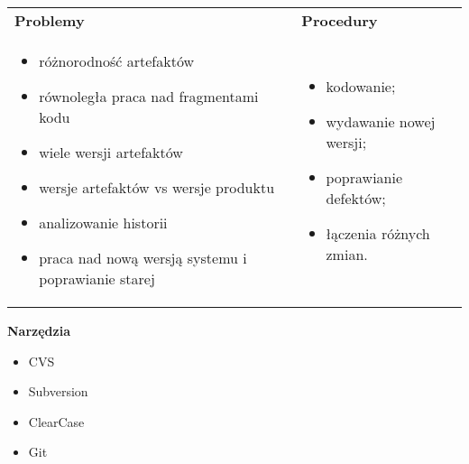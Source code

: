 \documentclass[../main.tex]{subfiles}
\begin{document}
    \begin{table}[H]
        \begin{center}
            \begin{tabular}{ p{.5\linewidth} p{.5\linewidth} }
                \textbf{Problemy} & \textbf{Procedury} \\
                \begin{itemize}
                    \item różnorodność artefaktów
                    \item równoległa praca nad fragmentami kodu
                    \item wiele wersji artefaktów
                    \item wersje artefaktów vs wersje produktu
                    \item analizowanie historii
                    \item praca nad nową wersją systemu i poprawianie starej
                \end{itemize}
                &
                \begin{itemize}
                    \item kodowanie;
                    \item wydawanie nowej wersji;
                    \item poprawianie defektów;
                    \item łączenia różnych zmian.
                \end{itemize}
                \\
            \end{tabular}
        \end{center}
    \end{table}

    \textbf{Narzędzia}
    \begin{itemize}
        \item CVS
        \item Subversion
        \item ClearCase
        \item Git
    \end{itemize}
\end{document}
